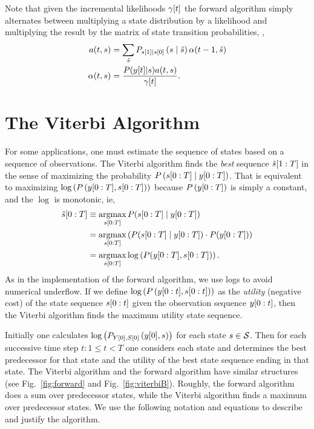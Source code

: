 Note that given the incremental likelihoods ${\gamma}{[t]}$ the
forward algorithm simply alternates between multiplying a state
distribution by a likelihood and multiplying the result by the matrix
of state transition probabilities, \ie,
\begin{subequations}
    \label{eq:2LineForward}
  \begin{align}
    \label{eq:alpha2a}
    a(t,s) &= \sum_{\tilde s} P_{{s}{[1]}\mid{s}{[0]}} \left(s\mid
             \tilde s \right) \alpha(t-1,\tilde s) \\
    \label{eq:a2alpha}
    \alpha(t,s) &= \frac{P({y}{[t]}|s) a(t,s)}{{\gamma}{[t]}}.
  \end{align}
\end{subequations}


\section{The Viterbi Algorithm}
\label{sec:viterbi}

For some applications, one must estimate the sequence of states based
on a sequence of observations.  The Viterbi algorithm %
%
finds the \emph{best} sequence $\hat s[1:T]$ in the sense of
maximizing the probability $P\left( s[0:T]\mid y[0:T]
\right)$.  That is equivalent to maximizing $\log \left( P\left(
    y[0:T],s[0:T] \right) \right)$ because $P \left(
  y[0:T] \right)$ is simply a constant, and the $\log$ is
monotonic, ie,
\begin{align*}
  \hat s[0:T] &\equiv \operatorname*{argmax}_{s[0:T]}
  P(s[0:T]\mid y[0:T])\\
  &= \operatorname*{argmax}_{s[0:T]} \left( P(s[0:T]\mid y[0:T]) \cdot
    P(y[0:T]) \right)\\
  &= \operatorname*{argmax}_{s[0:T]} \log \left( P(y[0:T],s[0:T])
  \right).
\end{align*}
As in the implementation of the forward algorithm, we use logs to
avoid numerical underflow.  If we define $\log \left( P\left(
    y[0:t], s[0:t] \right) \right)$ as the
\emph{utility} (negative cost) of the state sequence $s[0:t]$
given the observation sequence $y[0:t]$, then the Viterbi
algorithm finds the maximum utility state sequence.

Initially one calculates
$\log\left(P_{{Y}{[0]},{S}{[0]}} \left({y}{[0]}, s \right) \right)$
for each state $s \in \states$.  Then for each successive time step
$t: 1 \leq t < T$ one considers each state and determines the best
predecessor for that state and the utility of the best state sequence
ending in that state.  The Viterbi algorithm and the forward algorithm
have similar structures (see Fig.~\ref{fig:forward} and
Fig.~\ref{fig:viterbiB}).  Roughly, the forward algorithm does a sum
over predecessor states, while the Viterbi algorithm finds a maximum
over predecessor states. We use the following notation and equations
to describe and justify the algorithm.

